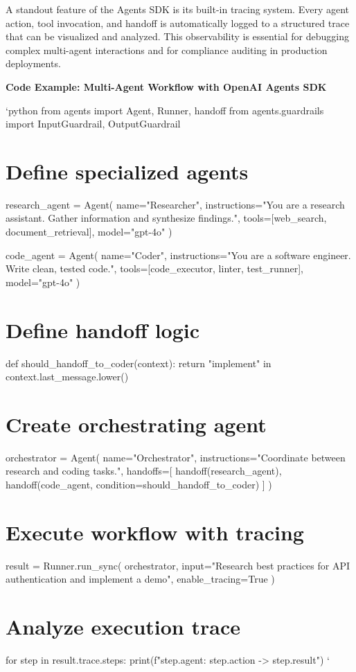 A standout feature of the Agents SDK is its built-in tracing system. Every agent action, tool invocation, and handoff is automatically logged to a structured trace that can be visualized and analyzed. This observability is essential for debugging complex multi-agent interactions and for compliance auditing in production deployments.

\textbf{Code Example: Multi-Agent Workflow with OpenAI Agents SDK}

\texttt{}`python
from agents import Agent, Runner, handoff
from agents.guardrails import InputGuardrail, OutputGuardrail

\section{Define specialized agents}
research_agent = Agent(
    name="Researcher",
    instructions="You are a research assistant. Gather information and synthesize findings.",
    tools=[web_search, document_retrieval],
    model="gpt-4o"
)

code_agent = Agent(
    name="Coder",
    instructions="You are a software engineer. Write clean, tested code.",
    tools=[code_executor, linter, test_runner],
    model="gpt-4o"
)

\section{Define handoff logic}
def should_handoff_to_coder(context):
    return "implement" in context.last_message.lower()

\section{Create orchestrating agent}
orchestrator = Agent(
    name="Orchestrator",
    instructions="Coordinate between research and coding tasks.",
    handoffs=[
        handoff(research_agent),
        handoff(code_agent, condition=should_handoff_to_coder)
    ]
)

\section{Execute workflow with tracing}
result = Runner.run_sync(
    orchestrator,
    input="Research best practices for API authentication and implement a demo",
    enable_tracing=True
)

\section{Analyze execution trace}
for step in result.trace.steps:
    print(f"{step.agent}: {step.action} -> {step.result}")
\texttt{}`

